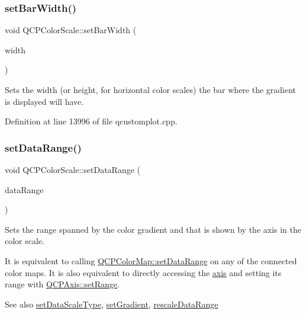 \subsubsection{\texorpdfstring{set\+Bar\+Width()}{setBarWidth()}}
{\footnotesize\ttfamily void Q\+C\+P\+Color\+Scale\+::set\+Bar\+Width (\begin{DoxyParamCaption}\item[{int}]{width }\end{DoxyParamCaption})}

Sets the width (or height, for horizontal color scales) the bar where the gradient is displayed will have. 

Definition at line 13996 of file qcustomplot.\+cpp.

\mbox{\label{class_q_c_p_color_scale_abe88633003a26d1e756aa74984587fef}} 
\subsubsection{\texorpdfstring{set\+Data\+Range()}{setDataRange()}}
{\footnotesize\ttfamily void Q\+C\+P\+Color\+Scale\+::set\+Data\+Range (\begin{DoxyParamCaption}\item[{const \hyperlink{class_q_c_p_range}{Q\+C\+P\+Range} \&}]{data\+Range }\end{DoxyParamCaption})}

Sets the range spanned by the color gradient and that is shown by the axis in the color scale.

It is equivalent to calling \hyperlink{class_q_c_p_color_map_a980b42837821159786a85b4b7dcb8774}{Q\+C\+P\+Color\+Map\+::set\+Data\+Range} on any of the connected color maps. It is also equivalent to directly accessing the \hyperlink{class_q_c_p_color_scale_a39bdbdb3b212602a5a57f9f3ea444190}{axis} and setting its range with \hyperlink{class_q_c_p_axis_aebdfea5d44c3a0ad2b4700cd4d25b641}{Q\+C\+P\+Axis\+::set\+Range}.

\begin{DoxySeeAlso}{See also}
\hyperlink{class_q_c_p_color_scale_aeb6107d67dd7325145b2498abae67fc3}{set\+Data\+Scale\+Type}, \hyperlink{class_q_c_p_color_scale_a1f29583bb6f1e7f473b62fb712be3940}{set\+Gradient}, \hyperlink{class_q_c_p_color_scale_a425983db4478543924ddbd04ea20a356}{rescale\+Data\+Range} 
\end{DoxySeeAlso}


